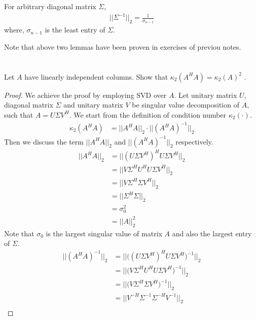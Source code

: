\documentclass[11pt,a4paper]{article}
\begin{document}
\begin{lemma}
    For arbitrary diagonal matrix $\Sigma$, 
    \begin{align}
        || \Sigma^{-1} ||_2 = \frac{1}{\sigma_{n-1}}
    \end{align}
    where, $\sigma_{n-1}$ is the least entry of $\Sigma$. 
\end{lemma}
Note that above two lemmas have been proven in exercises of previou notes.

\newpage
\section{}
Let $A$ have linearly independent columns. Show that $\kappa_2 (A^H A) =
\kappa_2 (A)^2$ .
\begin{proof}
    We achieve the proof by employing SVD over $A$. Let unitary matrix $U$,
    diagonal matrix $\Sigma$ and unitary matrix $V$ be singular value
    decomposition of $A$, such that $A = U \Sigma V^H$. We start from the
    definition of condition number $\kappa_2 (\cdot)$. 
    \begin{align}
        \kappa_2 (A^H A) &= || A^H A ||_2 \cdot || (A^H A)^{-1} ||_2 
    \end{align}
    Then we discuss the term $|| A^H A ||_2$ and $|| (A^H A)^{-1} ||_2$ respectively.
    \begin{align}
        || A^H A ||_2 
        &=  || (U \Sigma V^H)^H U \Sigma V^H ||_2 \\
        &=  || V \Sigma^H U^H U \Sigma V^H ||_2 \\
        &=  || V \Sigma^H \Sigma V^H ||_2 \\
        &=  || \Sigma^H \Sigma ||_2 \\
        &=  \sigma^2_0 \\
        &= || A ||_2^2
    \end{align}
    Note that $\sigma_0$ is the largest singular value of matrix $A$ and also
    the largest entry of $\Sigma$.
 \begin{align}
     || (A^H A)^{-1} ||_2 
     &=  || \big( (U \Sigma V^H)^H U \Sigma V^H \big)^{-1} ||_2 \\
     &=  || \big( V \Sigma^H U^H U \Sigma V^H \big)^{-1} ||_2 \\
     &=  || \big( V \Sigma^H \Sigma V^H \big)^{-1} ||_2 \\
     &=  || V^{-H} \Sigma^{-1} \Sigma^{-H} V^{-1}  ||_2 \\

\end{align}
\end{proof}
\end{document}
